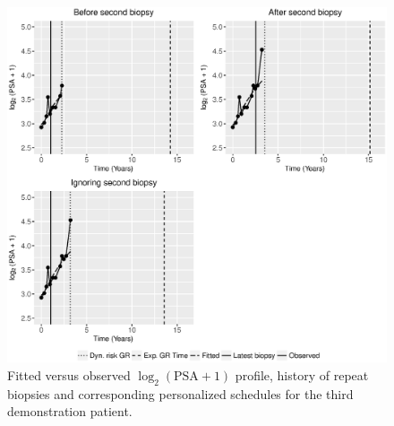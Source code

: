 \begin{figure}
\centerline{\includegraphics[width=\columnwidth]{images/prias_demo/case_2340_t3_log2psa_plus1.eps}}
\caption{Fitted versus observed $\log_2 (\mbox{PSA} +1)$ profile, history of repeat biopsies and corresponding personalized schedules for the third demonstration patient.}
\label{web_fig : prias_demo_pid_2340}
\end{figure}